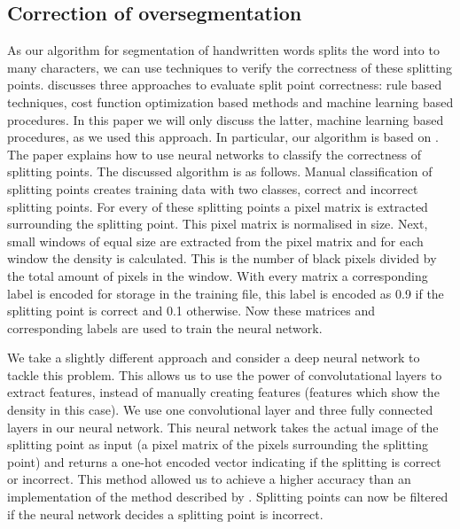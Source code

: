 \documentclass{article}
\begin{document}
\subsection{Correction of oversegmentation}
As our algorithm for segmentation of handwritten words splits the word into to many characters, we can use techniques to verify the correctness of these splitting points. 
\cite{evalsplitpoints} discusses three approaches to evaluate split point correctness: rule based techniques, cost function optimization based methods and machine learning based procedures. 
In this paper we will only discuss the latter, machine learning based procedures, as we used this approach. 
In particular, our algorithm is based on \cite{evalsplitpointsnn}. The paper explains how to use neural networks to classify the correctness of splitting points. The discussed algorithm is as follows. Manual classification of splitting points creates training data with two classes, correct and incorrect splitting points. 
For every of these splitting points a pixel matrix is extracted surrounding the splitting point. This pixel matrix is normalised in size. 
Next, small windows of equal size are extracted from the pixel matrix and for each window the density is calculated. This is the number of black pixels divided by the total amount of pixels in the window. 
With every matrix a corresponding label is encoded for storage in the training file, this label is encoded as 0.9 if the splitting point is correct and 0.1 otherwise. Now these matrices and corresponding labels are used to train the neural network. 

We take a slightly different approach and consider a deep neural network to tackle this problem. This allows us to use the power of convolutational layers to extract features, instead of manually creating features (features which show the density in this case). 
We use one convolutional layer and three fully connected layers in our neural network. This neural network takes the actual image of the splitting point as input (a pixel matrix of the pixels surrounding the splitting point) and returns a one-hot encoded vector indicating if the splitting is correct or incorrect. 
This method allowed us to achieve a higher accuracy than an implementation of the method described by \cite{evalsplitpointsnn}.
Splitting points can now be filtered if the neural network decides a splitting point is incorrect. 
\end{document}
